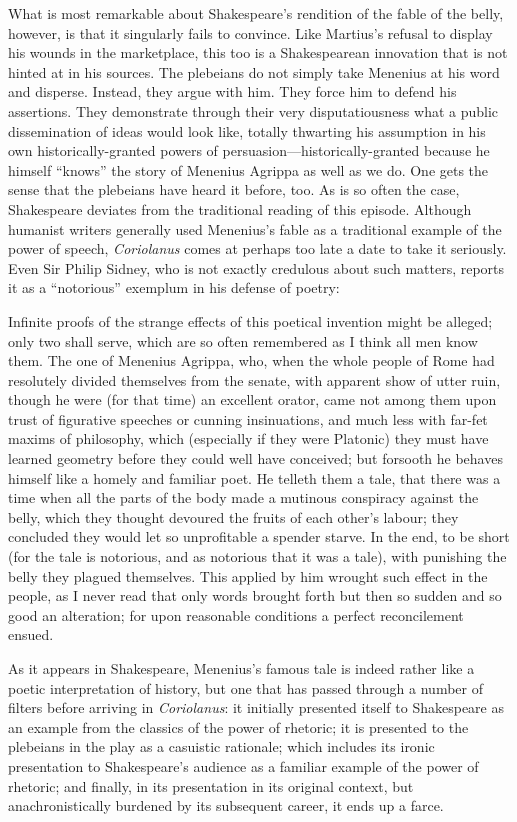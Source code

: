 What is most remarkable about Shakespeare's rendition of the fable of the belly, however, is that it singularly fails to convince.
Like Martius's refusal to display his wounds in the marketplace, this too is a Shakespearean innovation that is not hinted at in his sources.
The plebeians do not simply take Menenius at his word and disperse.
Instead, they argue with him.
They force him to defend his assertions.
They demonstrate through their very disputatiousness what a public dissemination of ideas would look like, totally thwarting his assumption in his own historically-granted powers of persuasion---historically-granted because he himself ``knows'' the story of Menenius Agrippa as well as we do.
One gets the sense that the plebeians have heard it before, too.
As is so often the case, Shakespeare deviates from the traditional reading of this episode.
Although humanist writers generally used Menenius's fable as a traditional example of the power of speech, \emph{Coriolanus} comes at perhaps too late a date to take it seriously.
Even Sir Philip Sidney, who is not exactly credulous about such matters, reports it as a ``notorious'' exemplum in his defense of poetry:
\begin{bq}
Infinite proofs of the strange effects of this poetical invention might be alleged; only two shall serve, which are so often remembered as I think all men know them.
The one of Menenius Agrippa, who, when the whole people of Rome had resolutely divided themselves from the senate, with apparent show of utter ruin, though he were (for that time) an excellent orator, came not among them upon trust of figurative speeches or cunning insinuations, and much less with far-fet maxims of philosophy, which (especially if they were Platonic) they must have learned geometry before they could well have conceived; but forsooth he behaves himself like a homely and familiar poet.
He telleth them a tale, that there was a time when all the parts of the body made a mutinous conspiracy against the belly, which they thought devoured the fruits of each other's labour; they concluded they would let so unprofitable a spender starve.
In the end, to be short (for the tale is notorious, and as notorious that it was a tale), with punishing the belly they plagued themselves.
This applied by him wrought such effect in the people, as I never read that only words brought forth but then so sudden and so good an alteration; for upon reasonable conditions a perfect reconcilement ensued.~\cite[41--42]{sidney_defence_1966}
\end{bq}
As it appears in Shakespeare, Menenius's famous tale is indeed rather like a poetic interpretation of history, but one that has passed through a number of filters before arriving in \emph{Coriolanus}: it initially presented itself to Shakespeare as an example from the classics of the power of rhetoric; it is presented to the plebeians in the play as a casuistic rationale; which includes its ironic presentation to Shakespeare's audience as a familiar example of the power of rhetoric; and finally, in its presentation in its original context, but anachronistically burdened by its subsequent career, it ends up a farce.
